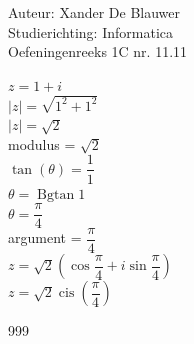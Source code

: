 \documentclass[a4paper]{article}
\begin{document}
\noindent \large Auteur: Xander De Blauwer \\
\noindent \large Studierichting: Informatica\\
\noindent \large Oefeningenreeks 1C nr. 11.11\\

\medskip

\normalsize



$z = 1 + i$ \\ 

$|z| = \sqrt{1^2 + 1^2}  $\\

$|z| = \sqrt{2} $\\

modulus = $\sqrt{2}$ \\



$\tan(\theta) = \dfrac{1}{1} $\\

$\theta = \operatorname{Bgtan}{1} $\\ 

$\theta = \dfrac{\pi}{4}$ \\


argument = $\dfrac{\pi}{4}$ \\
 


$z = \sqrt{2}\left(\cos\dfrac{\pi}{4} + i\sin\dfrac{\pi}{4}\right) $\\

$z = \sqrt{2}\operatorname{cis}\left(\dfrac{\pi}{4}\right) $\\



\begin{thebibliography}{999}
\end{thebibliography}
\end{document}
